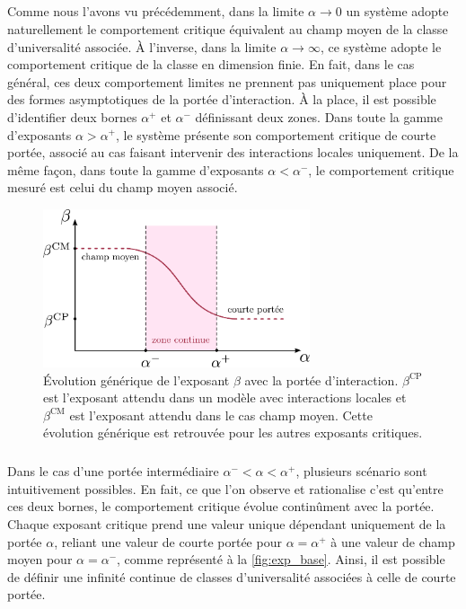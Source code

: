 \subparagraph{}Comme nous l'avons vu précédemment, dans la limite $\alpha \rightarrow 0$ un système adopte naturellement le comportement critique équivalent au champ moyen de la classe d'universalité associée. \`A l'inverse, dans la limite $\alpha \rightarrow \infty$, ce système adopte le comportement critique de la classe en dimension finie. En fait, dans le cas général, ces deux comportement limites ne prennent pas uniquement place pour des formes asymptotiques de la portée d'interaction. \`A la place, il est possible d'identifier deux bornes $\alpha^+$ et $\alpha^-$ définissant deux zones. Dans toute la gamme d'exposants $\alpha>\alpha^+$, le système présente son comportement critique de courte portée, associé au cas faisant intervenir des interactions locales uniquement. De la même façon, dans toute la gamme d'exposants $\alpha < \alpha^-$, le comportement critique mesuré est celui du champ moyen associé.

\begin{figure}[h]
	\centering
	\includegraphics[width=0.7\textwidth]{Chapitre1/Figures/LongRange/beta_base.pdf}
	\caption{Évolution générique de l'exposant $\beta$ avec la portée d'interaction. $\beta^\text{CP}$ est l'exposant attendu dans un modèle avec interactions locales et $\beta^\text{CM}$ est l'exposant attendu dans le cas champ moyen. Cette évolution générique est retrouvée pour les autres exposants critiques.}
	\label{fig:exp_base}
\end{figure}

\subparagraph{}Dans le cas d'une portée intermédiaire $\alpha^- < \alpha < \alpha^+$, plusieurs scénario sont intuitivement possibles. En fait, ce que l'on observe et rationalise c'est qu'entre ces deux bornes, le comportement critique évolue continûment avec la portée. Chaque exposant critique prend une valeur unique dépendant uniquement de la portée $\alpha$, reliant une valeur de courte portée pour $\alpha = \alpha^+$ à une valeur de champ moyen pour $\alpha = \alpha^-$, comme représenté à la \autoref{fig:exp_base}. Ainsi, il est possible de définir une infinité continue de classes d'universalité associées à celle de courte portée.

